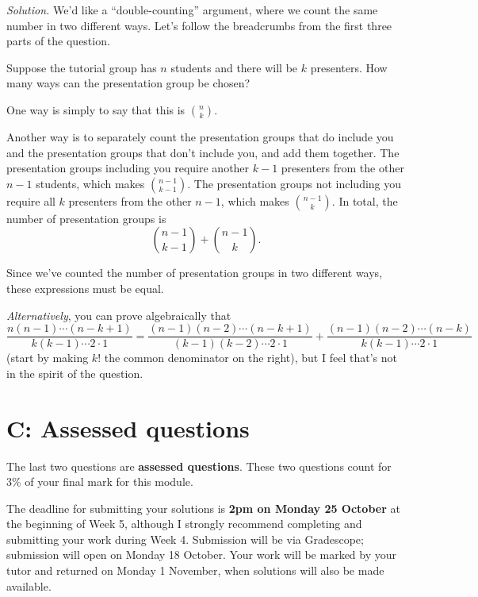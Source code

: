 \documentclass[
  a4paper,
]{book}
\theoremstyle{definition}
\theoremstyle{definition}
\theoremstyle{definition}
\theoremstyle{definition}
\theoremstyle{remark}
\begin{document}
\begin{myanswers}
\emph{Solution.}
We'd like a ``double-counting'' argument, where we count the same number in two different ways. Let's follow the breadcrumbs from the first three parts of the question.

Suppose the tutorial group has \(n\) students and there will be \(k\) presenters. How many ways can the presentation group be chosen?

One way is simply to say that this is \(\displaystyle\binom{n}{k}\).

Another way is to separately count the presentation groups that do include you and the presentation groups that don't include you, and add them together. The presentation groups including you require another \(k-1\) presenters from the other \(n -1\) students, which makes \(\binom{n-1}{k-1}\). The presentation groups not including you require all \(k\) presenters from the other \(n-1\), which makes \(\binom{n-1}{k}\). In total, the number of presentation groups is
\[ \binom{n-1}{k-1} + \binom{n-1}{k} . \]

Since we've counted the number of presentation groups in two different ways, these expressions must be equal.

\emph{Alternatively}, you can prove algebraically that
\[  \frac{n(n-1)\cdots(n-k+1)}{k(k-1)\cdots2\cdot1} = \frac{(n-1)(n-2)\cdots(n-k+1)}{(k-1)(k-2)\cdots2\cdot1} + \frac{(n-1)(n-2)\cdots(n-k)}{k(k-1)\cdots2\cdot1} \]
(start by making \(k!\) the common denominator on the right), but I feel that's not in the spirit of the question.

\end{myanswers}

\hypertarget{P2-assessed}{%
\section*{C: Assessed questions}\label{P2-assessed}}

The last two questions are \textbf{assessed questions}. These two questions count for 3\% of your final mark for this module.

The deadline for submitting your solutions is \textbf{2pm on Monday 25 October} at the beginning of Week 5, although I strongly recommend completing and submitting your work during Week 4. Submission will be via Gradescope; submission will open on Monday 18 October.
Your work will be marked by your tutor and returned on Monday 1 November, when solutions will also be made available.
\end{document}
